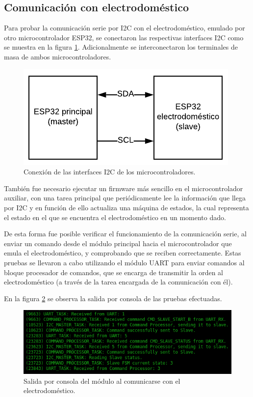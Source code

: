 \subsection{Comunicación con electrodoméstico}
\label{sec:pruebas_com_serie}

Para probar la comunicación serie por I2C con el electrodoméstico, emulado por otro microcontrolador ESP32, se conectaron las respectivas interfaces I2C como se muestra en la figura \ref{fig:esp32_connection}. Adicionalmente se interconectaron los terminales de masa de ambos microcontroladores.

\begin{figure}[h]
\centering
\includegraphics[scale=1.0]{./Figures/esp32_connection.pdf}
\caption{Conexión de las interfaces I2C de los microcontroladores.}
\label{fig:esp32_connection}
\end{figure}

También fue necesario ejecutar un firmware más sencillo en el microcontrolador auxiliar, con una tarea principal que periódicamente lee la información que llega por I2C y en función de ello actualiza una máquina de estados, la cual representa el estado en el que se encuentra el electrodoméstico en un momento dado.

De esta forma fue posible verificar el funcionamiento de la comunicación serie, al enviar un comando desde el módulo principal hacia el microcontrolador que emula el electrodoméstico, y comprobando que se reciben correctamente. Estas pruebas se llevaron a cabo utilizando el módulo UART para enviar comandos al bloque procesador de comandos, que se encarga de transmitir la orden al electrodoméstico (a través de la tarea encargada de la comunicación con él).

En la figura \ref{fig:output_i2c_master} se observa la salida por consola de las pruebas efectuadas.

\begin{figure}[h]
\centering
\includegraphics[width=\textwidth]{./Figures/output_master_i2c.png}
\caption{Salida por consola del módulo al comunicarse con el electrodoméstico.}
\label{fig:output_i2c_master}
\end{figure}

